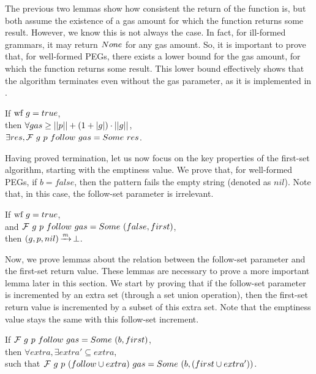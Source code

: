 The previous two lemmas show how consistent
the return of the function is,
but both assume the existence of a gas amount
for which the function returns some result.
However, we know this is not always the case.
In fact, for ill-formed grammars, it may return $None$
for any gas amount.
So, it is important to prove that,
for well-formed PEGs,
there exists a lower bound for the gas amount,
for which the function returns some result.
This lower bound effectively shows that
the algorithm terminates even without the gas parameter,
as it is implemented in \lpeg{}.

\begin{lemma}
If $\text{wf}\ g = true$, \\
then $\forall gas \ge ||p|| + (1 + |g|) \cdot ||g||$, \\
$\exists res, \mathcal{F}{}\ g\ p\ follow\ gas = Some\ res$.
\end{lemma}

Having proved termination,
let us now focus on the key properties
of the first-set algorithm,
starting with the emptiness value.
We prove that,
for well-formed PEGs,
if $b=false$,
then the pattern fails the empty string
(denoted as $nil$).
Note that, in this case,
the follow-set parameter is irrelevant.

\begin{lemma}
If $\text{wf}\ g = true$, \\
and $\mathcal{F}{}\ g\ p\ follow\ gas = Some\ (false, first)$, \\
then $(g,p,nil) \operatorname{\xrightarrow{\mathit{m}}} \operatorname{\bot}$.
\end{lemma}

Now, we prove lemmas about the
relation between the follow-set parameter
and the first-set return value.
These lemmas are necessary to prove a
more important lemma later in this section.
We start by proving that if the follow-set parameter
is incremented by an extra set (through a set union operation),
then the first-set return value is incremented by a subset
of this extra set.
Note that the emptiness value stays the same
with this follow-set increment.

\begin{lemma}
If $\mathcal{F}{}\ g\ p\ follow\ gas = Some\ (b, first)$, \\
then $\forall extra, \exists extra' \subseteq extra$, \\
such that $\mathcal{F}{}\ g\ p\ (follow \cup extra)\ gas = Some\ (b, (first \cup extra'))$.
\end{lemma}

